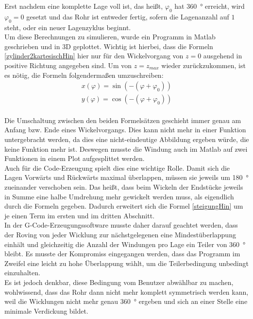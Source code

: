 \documentclass[paper=A4,pagesize,DIV=18, 12pt,listof=totoc,bibliography=totoc,headings=optiontohead,open=any]{article}
\begin{document}
Erst nachdem eine komplette Lage voll ist, das heißt, $\varphi_0$ hat \SI{360}{\degree} erreicht, wird $\varphi_0 = 0$ gesetzt und das Rohr ist entweder fertig, sofern die Lagenanzahl auf $1$ steht, oder ein neuer Lagenzyklus beginnt.\\
Um diese Berechnungen zu simulieren, wurde ein Programm in Matlab geschrieben und in 3D geplottet. Wichtig ist hierbei, dass die Formeln \eqref{zylinder2kartesischHin} hier nur für den Wickelvorgang von $z = 0$ ausgehend in positive Richtung angegeben sind. Um von $z = z_{max}$ wieder zurückzukommen, ist es nötig, die Formeln folgendermaßen umzuschreiben:\\
\begin{eqnarray}\label{zylinder2kartesischRück}
	x(\varphi) = \sin(-(\varphi + \varphi_0))\\
	y(\varphi) = \cos(-(\varphi + \varphi_0))
\end{eqnarray}\\
Die Umschaltung zwischen den beiden Formelsätzen geschieht immer genau am Anfang bzw. Ende eines Wickelvorgangs. Dies kann nicht mehr in einer Funktion untergebracht werden, da dies eine nicht-eindeutige Abbildung ergeben würde, die keine Funktion mehr ist. Deswegen musste die Windung auch im Matlab auf zwei Funktionen in einem Plot aufgesplittet werden. \\
Auch für die Code-Erzeugung spielt dies eine wichtige Rolle. Damit sich die Lagen Vorwärts und Rückwärts maximal überlappen, müssen sie jeweils um \SI{180}{\degree} zueinander verschoben sein. Das heißt, dass beim Wickeln der Endstücke jeweils in Summe eine halbe Umdrehung mehr gewickelt werden muss, als eigendlich durch die Formeln gegeben. Dadurch erweitert sich die Formel \eqref{steigungHin} um je einen Term im ersten und im dritten Abschnitt.\\
In der G-Code-Erzeugungssoftware musste daher darauf geachtet werden, dass der Roving von jeder Wicklung zur nächstgelegenen eine Mindestüberlappung einhält und gleichzeitig die Anzahl der Windungen pro Lage ein Teiler von \SI{360}{\degree} bleibt. Es musste der Kompromiss eingegangen werden, dass das Programm im Zweifel eine leicht zu hohe Überlappung wählt, um die Teilerbedingung unbedingt einzuhalten.\\
Es ist jedoch denkbar, diese Bedingung vom Benutzer abwählbar zu machen, wohlwissend, dass das Rohr dann nicht mehr komplett symmetrisch werden kann, weil die Wicklungen nicht mehr genau \SI{360}{\degree} ergeben und sich an einer Stelle eine minimale Verdickung bildet.\\
\end{document}
